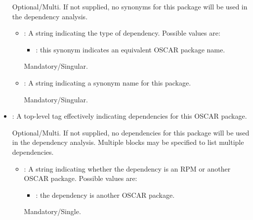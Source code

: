 \begin{itemize}
  Optional/Multi.  If not supplied, no synonyms for this package
  will be used in the dependency analysis.

  \begin{itemize}
  \item {}: A string indicating the type of dependency.
    Possible values are:

    \begin{itemize}
    \item {}: this synonym indicates an equivalent OSCAR
      package name.
    \end{itemize}

    Mandatory/Singular.
  \item {}: A string indicating a synonym name for this
    package.

    Mandatory/Singular.
  \end{itemize}

\item {}: A top-level tag effectively indicating
  dependencies for this OSCAR package.
  
  Optional/Multi.  If not supplied, no dependencies for this package
  will be used in the dependency analysis.  Multiple 
  blocks may be specified to list multiple dependencies.

  \begin{itemize}
  \item {}: A string indicating whether the dependency is
    an RPM or another OSCAR package.  Possible values are:

    \begin{itemize}
    \item {}: the dependency is another OSCAR package.
    \end{itemize}

    Mandatory/Single.
    

    

\end{itemize}
\end{itemize}
